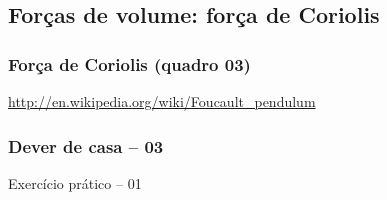 \subsection{Forças de volume: força de Coriolis}
\begin{frame}
\frametitle{Força de Coriolis (quadro 03)}
  \begin{center}
  \end{center}
  {\scriptsize \url{http://en.wikipedia.org/wiki/Foucault_pendulum}}
\end{frame}

\begin{frame}
\frametitle{Dever de casa -- 03}
  \begin{block}{}
    Exercício prático -- 01
  \end{block}
\end{frame}



